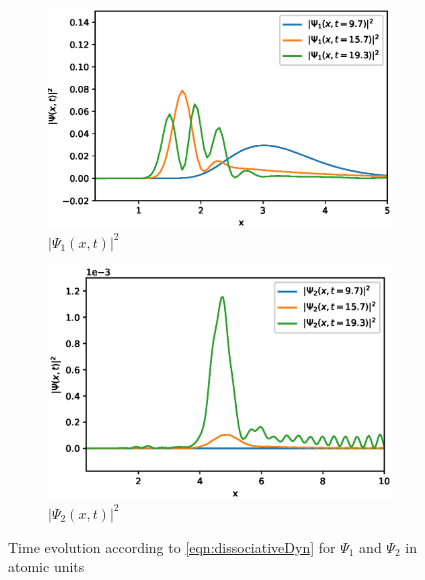 \documentclass[12pt]{article}
\begin{document}
\begin{figure}
	\centering
	\begin{subfigure}{0.4\textwidth} %
		\includegraphics[width=\textwidth]{withIR_1.eps}
		\caption{$|\Psi_1(x,t)|^2$} %
	\end{subfigure}
	\vspace{1em} %
	\begin{subfigure}{0.4\textwidth} %
		\includegraphics[width=\textwidth]{withIR_2.eps}
		\caption{$|\Psi_2(x,t)|^2$} %
	\end{subfigure}
	\caption{Time evolution according to \eqref{eqn:dissociativeDyn} for $\Psi_1$ and $\Psi_2$ in atomic units} 
\end{figure}



\end{document}
